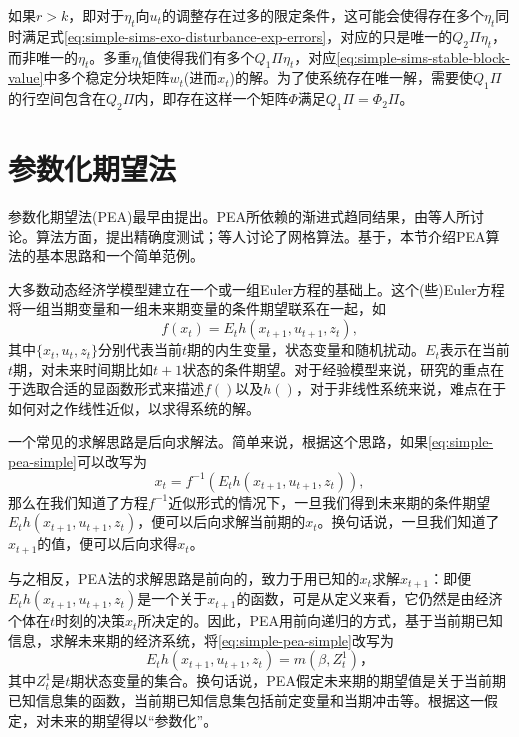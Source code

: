 如果$r>k$，即对于$\eta_t$向$u_t$的调整存在过多的限定条件，这可能会使得存在多个$\eta_t$同时满足式\eqref{eq:simple-sims-exo-disturbance-exp-errors}，对应的只是唯一的$Q_2 \Pi \eta_t$，而非唯一的$\eta_t$。多重$\eta_t$值使得我们有多个$Q_1 \Pi \eta_t$，对应\eqref{eq:simple-sims-stable-block-value}中多个稳定分块矩阵$w_t$(进而$x_t$)的解。为了使系统存在唯一解，需要使$Q_1 \Pi$的行空间包含在$Q_2 \Pi$内，即存在这样一个矩阵$\Phi$满足$Q_1 \Pi = \Phi _2 \Pi$。


\section{参数化期望法}
\label{sec:simple-pea-algorithm}

参数化期望法(PEA)最早由\cite{denHaan:1990bt}提出。PEA所依赖的渐进式趋同结果，由\cite{Marcet:1989do, Marcet:1994vw}等人所讨论。算法方面，\cite{denHaan:1994ej}提出精确度测试；\cite{Christiano:2000bw}等人讨论了网格算法。基于\cite{denHaan:1990bt}，本节介绍PEA算法的基本思路和一个简单范例。

大多数动态经济学模型建立在一个或一组Euler方程的基础上。这个(些)Euler方程将一组当期变量和一组未来期变量的条件期望联系在一起，如
\begin{equation}
  \label{eq:simple-pea-simple}
  f(x_t) = E_t h(x_{t+1}, u_{t+1}, z_t),
\end{equation}
其中$\{x_t, u_t, z_t\}$分别代表当前$t$期的内生变量，状态变量和随机扰动。$E_t$表示在当前$t$期，对未来时间期比如$t+1$状态的条件期望。对于经验模型来说，研究的重点在于选取合适的显函数形式来描述$f()$以及$h()$，对于非线性系统来说，难点在于如何对之作线性近似，以求得系统的解。

一个常见的求解思路是后向求解法。简单来说，根据这个思路，如果\eqref{eq:simple-pea-simple}可以改写为
\begin{equation*}
  x_t = f^{-1} \left(E_{t} h(x_{t+1}, u_{t+1}, z_t)\right),
\end{equation*}
那么在我们知道了方程$f^{-1}$近似形式的情况下，一旦我们得到未来期的条件期望$E_{t} h(x_{t+1}, u_{t+1}, z_t)$，便可以后向求解当前期的$x_t$。换句话说，一旦我们知道了$x_{t+1}$的值，便可以后向求得$x_{t}$。

与之相反，PEA法的求解思路是前向的，致力于用已知的$x_{t}$求解$x_{t+1}$：即便$E_{t} h(x_{t+1}, u_{t+1}, z_t)$是一个关于$x_{t+1}$的函数，可是从定义来看，它仍然是由经济个体在$t$时刻的决策$x_t$所决定的。因此，PEA用前向递归的方式，基于当前期已知信息，求解未来期的经济系统，将\eqref{eq:simple-pea-simple}改写为
\begin{equation}
  \label{eq:simple-pea-basic-thinking}
  E_t h(x_{t+1}, u_{t+1}, z_t) = m(\beta, Z_{t}^{1})，
\end{equation}
其中$Z_t^1$是$t$期状态变量的集合。换句话说，PEA假定未来期的期望值是关于当前期已知信息集的函数，当前期已知信息集包括前定变量和当期冲击等。根据这一假定，对未来的期望得以``参数化''。

